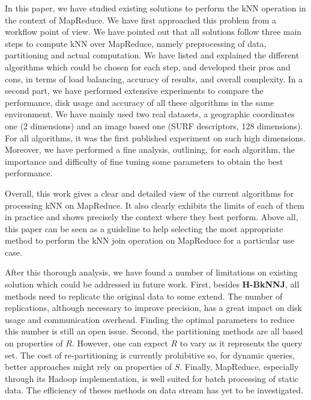 \documentclass[10pt,journal,compsoc]{IEEEtran}
\newcommand{\HBK}{{\bf H-BkNNJ}}
\begin{document}
In this paper, we have studied existing solutions to perform the kNN operation in the context of MapReduce. 
We have first approached this problem from a workflow 
point of view. We have pointed out that all solutions follow three main steps to compute kNN over MapReduce, namely 
preprocessing of data, partitioning and actual computation. We have listed and explained the different algorithms which could 
be chosen for each step, and developed their pros and cons, in terms of load 
balancing, accuracy of results, and overall complexity. 
In a second part, we have performed extensive experiments to compare the performance, disk 
usage and accuracy of all these algorithms in the same environment. We have mainly used two real datasets, a geographic
coordinates one (2 dimensions) and an image based one (SURF descriptors, 128 dimensions). For all algorithms,
it was the first published experiment on such high dimensions. Moreover, we have performed a fine analysis, 
outlining, for each algorithm, the importance and difficulty of fine tuning some parameters to obtain the best 
performance.

Overall, this work gives a clear and detailed view of the current algorithms for processing kNN on MapReduce. It also 
clearly exhibits the limits of each of them in practice and shows precisely the context where they best perform. Above 
all, this paper can be seen as a guideline to help 
selecting  the most appropriate method to perform the kNN join operation on MapReduce for a particular use case.

After this thorough analysis, we have found a number of limitations on existing solution which could be addressed 
in future work. First, besides 
\HBK, all methods need to replicate the original data to some extend. The number of replications, although
necessary to improve precision, has a great impact on  disk usage and  communication overhead. Finding the optimal
parameters to reduce this number is still an open issue. 
Second, the partitioning methods are all based on properties of $R$. However, one can expect $R$ to vary as it 
represents the query set. The cost of re-partitioning is currently prohibitive so, for dynamic queries, better 
approaches might rely on properties of $S$. Finally, MapReduce, especially through its Hadoop implementation, is well 
suited for
batch processing of static data. The efficiency of theses methods on data stream has yet to be investigated. 




\ifCLASSOPTIONcompsoc
\end{document}
